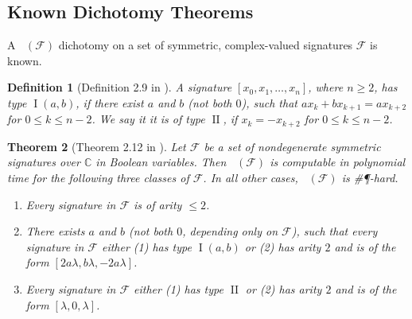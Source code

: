 \documentclass[11pt]{article}
\newtheorem{theorem}{Theorem}[section]
\newtheorem{definition}[theorem]{Definition}
\DeclareMathOperator{\holbs}{Holant^*_2}
\DeclareMathOperator{\typei}{I}
\DeclareMathOperator{\typeii}{II}
\begin{document}
\subsection{Known Dichotomy Theorems}
A $\holbs(\mathcal{F})$ dichotomy on a set of symmetric, complex-valued signatures $\mathcal{F}$ is known.
\begin{definition}[Definition 2.9 in \cite{cai_complexity_2017}]\label{def:boolean-signature-type-i-ii}
  A signature $[x_0, x_1, \ldots, x_n]$, where $n \ge 2$, has type $\typei(a, b)$, if there exist $a$ and $b$ (not both $0$), such that $a x_k + b x_{k+1} = a x_{k+2}$ for $0 \le k \le n -2$.
  We say it it is of type $\typeii$, if $x_k = - x_{k+2}$ for $0 \le k \le n - 2$.
\end{definition}
\begin{theorem}[Theorem 2.12 in \cite{cai_complexity_2017}]\label{thm:dich-sym-Boolean}
Let $\mathcal{F}$ be a set of nondegenerate symmetric signatures over $\mathbb{C}$ in Boolean variables.
Then $\holbs(\mathcal{F})$ is computable in polynomial time for the following three classes of $\mathcal{F}$.
In all other cases, $\holbs(\mathcal{F})$ is \#\P-hard.
\begin{enumerate}
  \item Every signature in $\mathcal{F}$ is of arity $\le 2$.
  \item There exists $a$ and $b$ (not both $0$, depending only on $\mathcal{F}$), such that every signature in $\mathcal{F}$ either (1) has type $\typei(a,b)$ or (2) has arity $2$ and is of the form $[2a \lambda, b \lambda, -2 a \lambda]$.
  \item Every signature in $\mathcal{F}$ either (1) has type $\typeii$ or (2) has arity $2$ and is of the form $[\lambda, 0, \lambda]$.
\end{enumerate}
\end{theorem}
\end{document}
